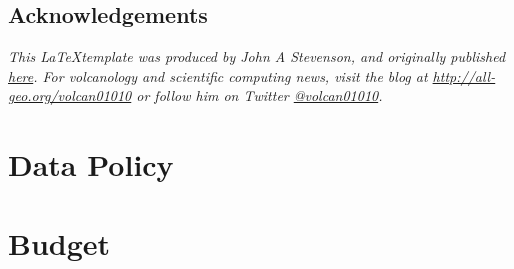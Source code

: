 \documentclass[a4paper,12pt,twocolumn]{article}
\begin{document}
\subsection*{Acknowledgements}
\textit{This \LaTeX template was produced by John A Stevenson, and originally published \href{http://all-geo.org/volcan01010/2013/07/grant-applications-are-hard-work-includes-latex-template}{here}.  For volcanology and scientific computing news, visit the blog at \href{http://all-geo.org/volcan01010}{http://all-geo.org/volcan01010} or follow him on Twitter \href{https://twitter.com/volcan01010}{@volcan01010}.}


\twocolumn[
  \begin{@twocolumnfalse}

\end{@twocolumnfalse}
]

\section{Data Policy}

\section{Budget}
\end{document}
